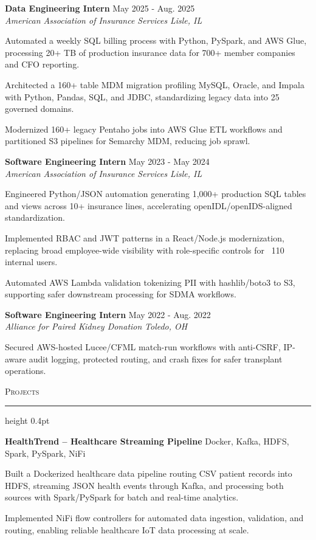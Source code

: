 \documentclass[letterpaper,11pt]{article}
\newcommand{\resumesection}[1]{%
  \par\vspace{2pt}%
  {\large\scshape #1}\par\vspace{2pt}%
  \hrule height 0.4pt\vspace{2pt}%
}
\newcommand{\resumeSubheading}[4]{
  \textbf{#1} \hfill #2\\
  \textit{#3} \hfill \textit{#4}
}
\newcommand{\projectHeading}[2]{
  \textbf{#1} \hfill #2
}
\begin{document}
\resumeSubheading
{Data Engineering Intern}{May 2025 - Aug. 2025}
{American Association of Insurance Services}{Lisle, IL}
\begin{tightitemize}
  \item Automated a weekly SQL billing process with Python, PySpark, and AWS Glue, processing 20+ TB of production insurance data for 700+ member companies and CFO reporting.
  \item Architected a 160+ table MDM migration profiling MySQL, Oracle, and Impala with Python, Pandas, SQL, and JDBC, standardizing legacy data into 25 governed domains.
  \item Modernized 160+ legacy Pentaho jobs into AWS Glue ETL workflows and partitioned S3 pipelines for Semarchy MDM, reducing job sprawl.
\end{tightitemize}

\resumeSubheading
{Software Engineering Intern}{May 2023 - May 2024}
{American Association of Insurance Services}{Lisle, IL}
\begin{tightitemize}
  \item Engineered Python/JSON automation generating 1,000+ production SQL tables and views across 10+ insurance lines, accelerating openIDL/openIDS-aligned standardization.
  \item Implemented RBAC and JWT patterns in a React/Node.js modernization, replacing broad employee-wide visibility with role-specific controls for ~110 internal users.
  \item Automated AWS Lambda validation tokenizing PII with hashlib/boto3 to S3, supporting safer downstream processing for SDMA workflows.
\end{tightitemize}

\resumeSubheading
{Software Engineering Intern}{May 2022 - Aug. 2022}
{Alliance for Paired Kidney Donation}{Toledo, OH}
\begin{tightitemize}
  \item Secured AWS-hosted Lucee/CFML match-run workflows with anti-CSRF, IP-aware audit logging, protected routing, and crash fixes for safer transplant operations.
\end{tightitemize}

\resumesection{Projects}
\projectHeading{HealthTrend -- Healthcare Streaming Pipeline}{Docker, Kafka, HDFS, Spark, PySpark, NiFi}
\begin{tightitemize}
  \item Built a Dockerized healthcare data pipeline routing CSV patient records into HDFS, streaming JSON health events through Kafka, and processing both sources with Spark/PySpark for batch and real-time analytics.
  \item Implemented NiFi flow controllers for automated data ingestion, validation, and routing, enabling reliable healthcare IoT data processing at scale.
\end{tightitemize}
\end{document}
